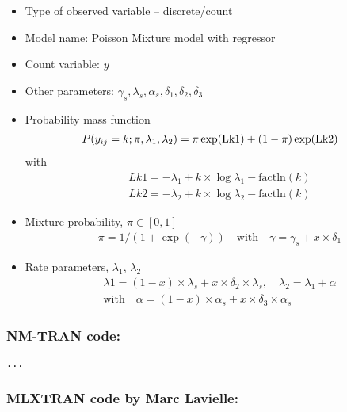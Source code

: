 \begin{itemize}
\item
Type of observed variable -- discrete/count
\item
Model name: Poisson Mixture model with regressor
\item
Count variable: $y$
\item
Other parameters: $\gamma_s, \lambda_s, \alpha_s, \delta_1, \delta_2, \delta_3$
\item
Probability mass function
\begin{align}
& P(y_{ij} = k;\pi,\lambda_1,\lambda_2) = \pi \exp(\rm Lk1) + (1-\pi) \exp(\rm Lk2) \nonumber
\end{align}
with
\begin{align}
& Lk1 = -\lambda_1 + k \times \log{\lambda_1} - \text{factln}(k) \nonumber \\ 
& Lk2 = -\lambda_2 + k \times \log{\lambda_2} - \text{factln}(k) \nonumber
\end{align}
\item
Mixture probability, $\pi \in [0,1]$
\begin{align}
& \pi = 1/(1+\exp(-\gamma)) \quad \text{with} \quad \gamma = \gamma_s + x\times \delta_1  \nonumber
\end{align}
\item
Rate parameters, $\lambda_1$, $\lambda_2$
\begin{align}
& \lambda1 = (1-x)\times \lambda_s + x\times \delta_2\times \lambda_s, \quad \lambda_2 = \lambda_1 + \alpha \nonumber 
 \nonumber \\
& \text{with} \quad \alpha = (1-x)\times \alpha_s + x\times \delta_3\times \alpha_s \nonumber 
\end{align}
\end{itemize}


\subsubsection{NM-TRAN code:}
\myStartLine
\lstset{language=NONMEMdataSet}
\begin{lstlisting}
...
\end{lstlisting}
\myEndLine

\subsubsection{MLXTRAN code by Marc Lavielle:}

